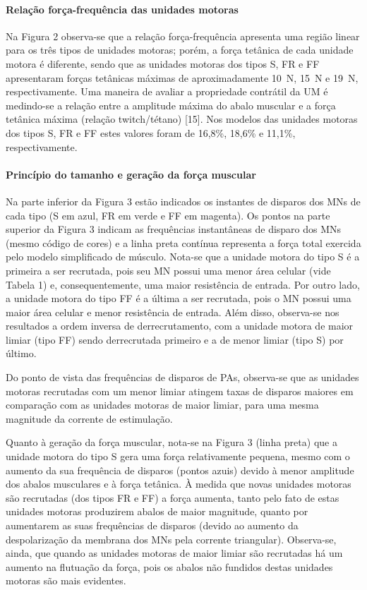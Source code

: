 \paragraph{Relação força-frequência das unidades motoras}
Na Figura 2 observa-se que a relação força-frequência apresenta uma região linear para os três tipos de unidades motoras; porém, a força tetânica de cada unidade motora é diferente, sendo que as unidades motoras dos tipos S, FR e FF apresentaram forças tetânicas máximas de aproximadamente 10 N, 15 N e 19 N, respectivamente. Uma maneira de avaliar a propriedade contrátil da UM é medindo-se a relação entre a amplitude máxima do abalo muscular e a força tetânica máxima (relação twitch/tétano) [15]. Nos modelos das unidades motoras dos tipos S, FR e FF estes valores foram de 16,8\%, 18,6\% e 11,1\%, respectivamente.


\paragraph{Princípio do tamanho e geração da força muscular}
Na parte inferior da Figura 3 estão indicados os instantes de disparos dos MNs de cada tipo (S em azul, FR em verde e FF em magenta). Os pontos na parte superior da Figura 3 indicam as frequências instantâneas de disparo dos MNs (mesmo código de cores) e a linha preta contínua representa a força total exercida pelo modelo simplificado de músculo. Nota-se que a unidade motora do tipo S é a primeira a ser recrutada, pois seu MN possui uma menor área celular (vide Tabela 1) e, consequentemente, uma maior resistência de entrada. Por outro lado, a unidade motora do tipo FF é a última a ser recrutada, pois o MN possui uma maior área celular e menor resistência de entrada. Além disso, observa-se nos resultados a ordem inversa de derrecrutamento, com a unidade motora de maior limiar (tipo FF) sendo derrecrutada primeiro e a de menor limiar (tipo S) por último.

Do ponto de vista das frequências de disparos de PAs, observa-se que as unidades motoras recrutadas com um menor limiar atingem taxas de disparos maiores em comparação com as unidades motoras de maior limiar, para uma mesma magnitude da corrente de estimulação.

Quanto à geração da força muscular, nota-se na Figura 3 (linha preta) que a unidade motora do tipo S gera uma força relativamente pequena, mesmo com o aumento da sua frequência de disparos (pontos azuis) devido à menor amplitude dos abalos musculares e à força tetânica. À medida que novas unidades motoras são recrutadas (dos tipos FR e FF) a força aumenta, tanto pelo fato de estas unidades motoras produzirem abalos de maior magnitude, quanto por aumentarem as suas frequências de disparos (devido ao aumento da despolarização da membrana dos MNs pela corrente triangular). Observa-se, ainda, que quando as unidades motoras de maior limiar são recrutadas há um aumento na flutuação da força, pois os abalos não fundidos destas unidades motoras são mais evidentes.

